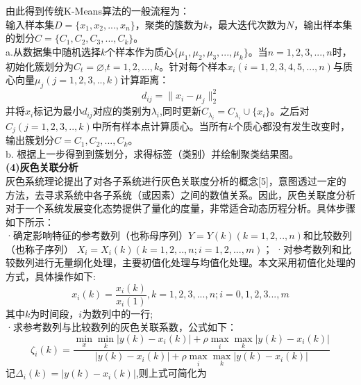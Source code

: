 \documentclass[UTF8]{article}
\begin{document}
        由此得到传统K-Means算法的一般流程为：\\
            输入样本集$D=\{ x_1,x_2,...,x_n\} $，聚类的簇数为$k$，最大迭代次数为$N$，输出样本集的划分$C=\{ C_1,C_2,C_3,...,C_k\} $。\\
            a.从数据集中随机选择$k$个样本作为质心$\{\mu_1,\mu_2,\mu_3,...,\mu_k \}$。当$n=1,2,3,...,n$时，初始化簇划分为$C_t=\varnothing $,$t=1,2,...,k$。针对每个样本$x_i(i=1,2,3,4,5,...,n)$与质心向量$\mu_j(j=1,2,3,..,k)$计算距离：\\
                \begin{equation}
                    d_{ij} = \|x_i-\mu_j\|_2^2 
                \end{equation}
            并将$x_i$标记为最小$d_{ij}$对应的类别为$\lambda_i$,同时更新$C_{\lambda_i}=C_{\lambda_i}\cup\{x_i\}$。之后对$C_j(j=1,2,3,..,k)$中所有样本点计算质心。当所有$k$个质心都没有发生改变时，输出簇划分$C={C_1,C_2,...,C_k}$。\\
            b. 根据上一步得到到簇划分，求得标签（类别）并绘制聚类结果图。\\
            \textbf{(4)灰色关联分析}\\
            灰色系统理论提出了对各子系统进行灰色关联度分析的概念[5]，意图透过一定的方法，去寻求系统中各子系统（或因素）之间的数值关系。因此，灰色关联度分析对于一个系统发展变化态势提供了量化的度量，非常适合动态历程分析。具体步骤如下所示：\\
            ·确定影响特征的参考数列（也称母序列）$Y=Y(k)(k=1,2,..,n)$和比较数列（也称子序列） $X_i=X_i(k)(k=1,2,..,n;i=1,2,...,m)$；
            ·对参考数列和比较数列进行无量纲化处理，主要初值化处理与均值化处理。本文采用初值化处理的方式，具体操作如下:\\
                \begin{equation}
                    x_i(k)=\frac{x_i(k)}{x_i(1)},k=1,2,3,...,n;i=0,1,2,3...,m
                \end{equation}
            其中$k$为时间段，$i$为数列中的一行;\\
            ·求参考数列与比较数列的灰色关联系数，公式如下：\\
                \begin{equation}
                    \zeta_i(k)=\frac{\min\limits_{x}\min\limits_{k}\lvert y(k)-x_i(k)\rvert + \rho\max\limits_{i}\max\limits_{k}\lvert y(k)-x_i(k)\rvert}{\lvert y(k)-x_i(k) \rvert + \rho\max\limits_{i}\max\limits_{k}\lvert y(k)-x_i(k) \rvert} 
                \end{equation}
            记$\Delta_i(k)=\lvert y(k)-x_i(k) \rvert$,则上式可简化为\\
\end{document}
